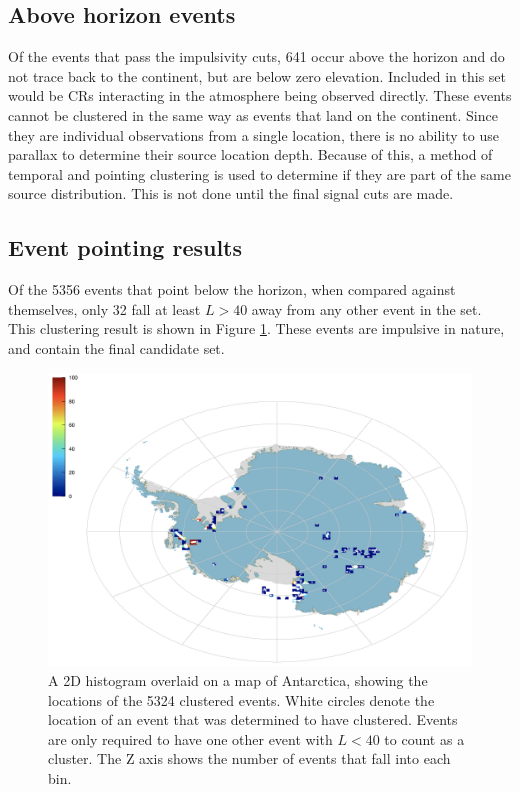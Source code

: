 	\subsection{Above horizon events}
		Of the events that pass the impulsivity cuts, 641 occur above the horizon and do not trace back to the continent, but are below zero elevation.  Included in this set would be CRs interacting in the atmosphere being observed directly.  These events cannot be clustered in the same way as events that land on the continent.  Since they are individual observations from a single location, there is no ability to use parallax to determine their source location depth.  Because of this, a method of temporal and pointing clustering is used to determine if they are part of the same source distribution.  This is not done until the final signal cuts are made.
		

	\subsection{Event pointing results}
		Of the 5356 events that point below the horizon, when compared against themselves, only 32 fall at least $L>40$ away from any other event in the set. This clustering result is shown in Figure \ref{fig:clusteredImpulsives}.  These events are impulsive in nature, and contain the final candidate set.
		
		\begin{figure}
			\centering
				\includegraphics[width=\textwidth]{figures/clusteredImpulsives}
				\caption{A 2D histogram overlaid on a map of Antarctica, showing the locations of the 5324 clustered events.  White circles denote the location of an event that was determined to have clustered.  Events are only required to have one other event with $L<40$ to count as a cluster.  The Z axis shows the number of events that fall into each bin.} 
			\label{fig:clusteredImpulsives}
		\end{figure}	
	

